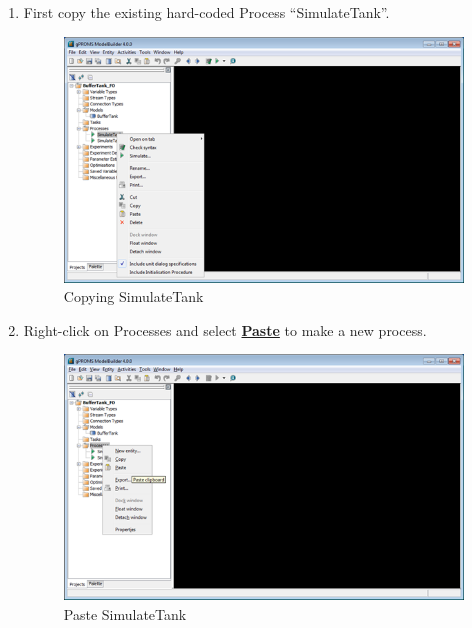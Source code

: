 \begin{enumerate}
\item First copy the existing hard-coded Process ``SimulateTank''.

\begin{figure}[H]
	\begin{center}
		\includegraphics[scale=0.55]{Chapt_sinter/figs/gPROMS/04_EditBufferTank}
		\caption{Copying SimulateTank}
		\label{fig.sinter.gproms.copysimulatetank}
	\end{center}
\end{figure}

\item Right-click on Processes and select \textbf{\underline{Paste}} to make a new process.

\begin{figure}[H]
	\begin{center}
		\includegraphics[scale=0.55]{Chapt_sinter/figs/gPROMS/05_EditBufferTank}
		\caption{Paste SimulateTank}
		\label{fig.sinter.gproms.pastesimulatetank}
	\end{center}
\end{figure}


\end{enumerate}
